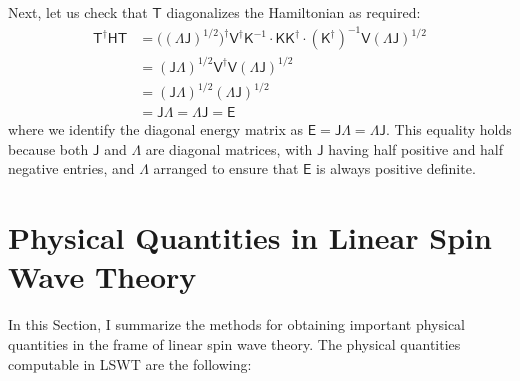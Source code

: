\documentclass[aps, prx, nofootinbib, superscriptaddress]{revtex4-2}
\begin{document}
Next, let us check that $\mathsf{T}$ diagonalizes the Hamiltonian as required:
\begin{align*}
    \mathsf{T}^{\dagger} \mathsf{HT}
    &= \big( \mathsf{(\Lambda J)}^{1/2} \big)^{\dagger} \mathsf{V}^{\dagger} \mathsf{K}^{-1} \cdot \mathsf{KK}^{\dagger} \cdot (\mathsf{K}^{\dagger})^{-1} \mathsf{V} \mathsf{(\Lambda J)}^{1/2} \\
    &= \mathsf{(J\Lambda)}^{1/2} \mathsf{V}^{\dagger} \mathsf{V} \mathsf{(\Lambda J)}^{1/2} \\
    &= \mathsf{(J\Lambda)}^{1/2} \mathsf{(\Lambda J)}^{1/2} \\
    &= \mathsf{J\Lambda} = \mathsf{\Lambda J} = \mathsf{E}
\end{align*}
where we identify the diagonal energy matrix as $\mathsf{E} = \mathsf{J\Lambda} = \mathsf{\Lambda J}$. This equality holds because both $\mathsf{J}$ and $\mathsf{\Lambda}$ are diagonal matrices, with $\mathsf{J}$ having half positive and half negative entries, and $\mathsf{\Lambda}$ arranged to ensure that $\mathsf{E}$ is always positive definite.



\newpage



\section{Physical Quantities in Linear Spin Wave Theory}

In this Section, I summarize the methods for obtaining important physical quantities in the frame of linear spin wave theory.
The physical quantities computable in LSWT are the following:
\end{document}
